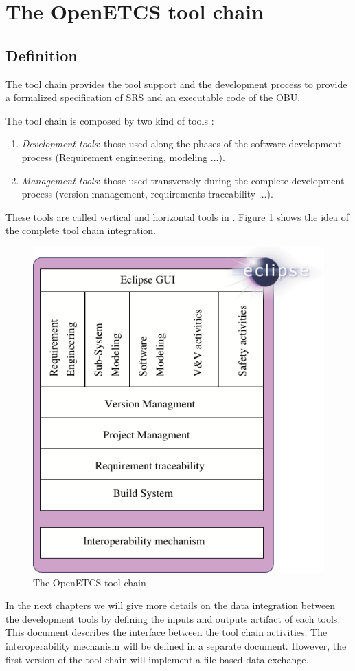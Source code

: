 \section{The OpenETCS tool chain}
\subsection{Definition}
The tool chain provides the tool support and the development process
to provide a formalized specification of \gls{SRS} and an executable
code of the \gls{OBU}.


The tool chain is composed by two kind of tools :
\begin{enumerate}
\item {\it Development tools}: those used along the phases of the software
  development process (Requirement engineering, modeling ...).
\item {\it Management tools}:  those used transversely during the
  complete development process (version management, requirements
  traceability ...).
\end{enumerate}
These tools are called vertical and horizontal tools in
\cite{wasserman_tool_1990}. 
Figure \ref{fig:toolchain} shows the idea of the complete tool chain
integration.

\begin{figure}[htbp]
\centering
  \includegraphics[width=.5\textwidth]{images/toolchain_archi-dev}
  \caption{The OpenETCS tool chain}
  \label{fig:toolchain}
\end{figure}

In the next chapters  we will give more details on the
data integration between the development tools by defining the inputs
and outputs artifact of each tools. This document describes the
interface between the tool chain activities.
The interoperability mechanism will be defined in a separate
document. However, the first version of the tool chain will implement a
file-based data exchange.
 
